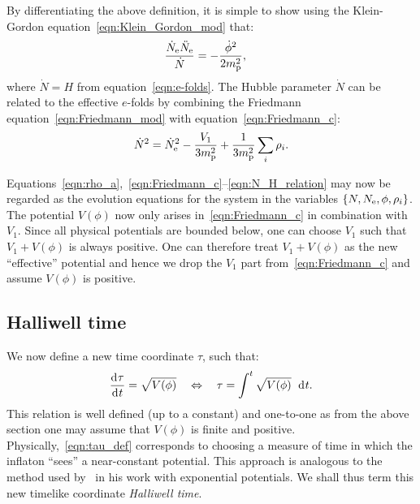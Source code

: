 By differentiating the above definition, it is simple to show using the Klein-Gordon equation~\eqref{eqn:Klein_Gordon_mod} that:
%
\begin{align}
  \frac{\dot{N}_\mathrm{e} \ddot{N}_\mathrm{e}}{\dot{N}}  
  &=
  -\frac{\dot{\phi}^2}{2m_{\mathrm{p}}^2},
  \label{eqn:Raychaudhuri_c}
\end{align}
%
where $\dot{N}=H$ from equation~\eqref{eqn:e-folds}. The Hubble parameter $\dot{N}$ can be related to the effective $e$-folds by combining the Friedmann equation~\eqref{eqn:Friedmann_mod} with equation~\eqref{eqn:Friedmann_c}:
%
\begin{equation}
  \dot{N}^2 = \dot{N}_\mathrm{e}^2 -\frac{V_1}{3m_{\mathrm{p}}^2} + \frac{1}{3m_{\mathrm{p}}^2}\sum_i\rho_i.
  \label{eqn:N_H_relation}
\end{equation}
%

Equations~\eqref{eqn:rho_a},~\eqref{eqn:Friedmann_c}--\eqref{eqn:N_H_relation} may now be regarded as the evolution equations for the system in the variables $\{N,N_\mathrm{e},\phi,\rho_i\}$.  The potential $V(\phi)$ now only arises in~\eqref{eqn:Friedmann_c} in combination with $V_1$.  Since all physical potentials are bounded below, one can choose $V_1$ such that $V_1+V(\phi)$ is always positive. One can therefore treat $V_1+V(\phi)$ as the new ``effective'' potential and hence we drop the $V_1$ part from~\eqref{eqn:Friedmann_c} and assume $V(\phi)$ is positive.

\subsection{Halliwell time}
%
We now define a new time coordinate $\tau$, such that:
%
\begin{equation}
  \frac{\operatorname{d}^{}\!{\tau}}{\operatorname{d}^{}\!{t}} 
  = 
  \sqrt{V(\phi)} \quad\Leftrightarrow\quad \tau 
  = 
  \int^t \sqrt{V(\phi)}\:\: \operatorname{d}^{}\!{t}.
  \label{eqn:tau_def}
\end{equation}
%
This relation is well defined (up to a constant) and one-to-one as from the above section one may assume that $V(\phi)$ is finite and positive. Physically,~\eqref{eqn:tau_def} corresponds to choosing a measure of time in which the inflaton ``sees'' a near-constant potential. This approach is analogous to the method used by~\citet{halliwell_scalar_1987} in his work with exponential potentials. We shall thus term this new timelike coordinate {\em Halliwell time}.


